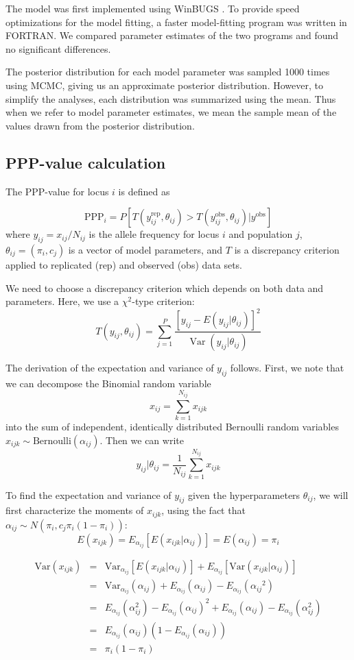 \documentclass[a4paper,12pt]{article}
\begin{document}
The model was first implemented using WinBUGS \cite{winbugs}. To
provide speed optimizations for the model fitting, a faster
model-fitting program was written in FORTRAN. We compared parameter
estimates of the two programs and found no significant differences.

The posterior distribution for each model parameter was sampled 1000
times using MCMC, giving us an approximate posterior
distribution. However, to simplify the analyses, each distribution was
summarized using the mean. Thus when we refer to model parameter
estimates, we mean the sample mean of the values drawn from the
posterior distribution.

\subsection{PPP-value calculation}

The PPP-value for locus $i$ is defined as

$$\text{PPP}_i = 
P\left[T(y_{ij}^{\text{rep}},\theta_{ij})>
       T(y_{ij}^{\text{obs}},\theta_{ij})|y^{\text{obs}}\right]
$$
where $y_{ij}=x_{ij}/N_{ij}$ is the allele frequency for locus $i$ and
population $j$, $\theta_{ij}=(\pi_i,c_j)$ is a vector of model
parameters, and $T$ is a discrepancy criterion applied to replicated
(rep) and observed (obs) data sets.

We need to choose a discrepancy criterion which depends on both data
and parameters. Here, we use a $\chi^2$-type criterion:
$$T(y_{ij},\theta_{ij}) = \sum_{j=1}^P 
\frac{\left[y_{ij} - E(y_{ij}|\theta_{ij})\right]^2}{
  \operatorname{Var}(y_{ij}|\theta_{ij})}
$$

The derivation of the expectation and variance of $y_{ij}$
follows. First, we note that we can decompose the Binomial random
variable
$$
x_{ij}=\sum_{k=1}^{N_{ij}} x_{ijk}
$$
into the sum of independent, identically distributed Bernoulli random
variables $x_{ijk}\sim \text{Bernoulli}(\alpha_{ij})$. Then we can write
$$
y_{ij}|\theta_{ij} = \frac 1 {N_{ij}} \sum_{k=1}^{N_{ij}} x_{ijk}
$$

To find the expectation and variance of $y_{ij}$ given the
hyperparameters $\theta_{ij}$, we will first characterize the moments
of $x_{ijk}$, using the fact that $\alpha_{ij}\sim
N(\pi_i,c_j\pi_i(1-\pi_i))$: \newcommand{\eaij}{E_{{\alpha_{ij}}}}
\newcommand{\vaij}{\Var_{{\alpha_{ij}}}}
$$
E(x_{ijk}) = \eaij \left[ E(x_{ijk}|{\alpha_{ij}})\right] = E({\alpha_{ij}}) = \pi_i
$$

\newcommand{\Var}{\text{Var}}
\newcommand{\Cov}{\text{Cov}}
\begin{eqnarray*}
  \text{Var}(x_{ijk}) &=&
  \Var_{\alpha_{ij}} \left[ E(x_{ijk}|\alpha_{ij}) \right] +
  E_{\alpha_{ij}} \left[ \Var(x_{ijk}|\alpha_{ij}) \right] \\
  &=& 
  \vaij(\alpha_{ij}) + \eaij({\alpha_{ij}})-\eaij({\alpha_{ij}}^2)
  \\
  &=&
  \eaij(\alpha_{ij}^2)-\eaij(\alpha_{ij})^2+
  \eaij(\alpha_{ij})-\eaij(\alpha_{ij}^2)\\
  &=&
  \eaij(\alpha_{ij})\left(1-\eaij(\alpha_{ij})\right)
  \\
  &=&\pi_i(1-\pi_i)
\end{eqnarray*}
\end{document}
